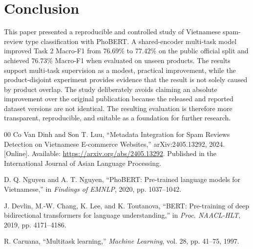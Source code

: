 \documentclass[runningheads]{llncs}
\begin{document}
\section{Conclusion}
This paper presented a reproducible and controlled study of Vietnamese spam-review type classification with PhoBERT. A shared-encoder multi-task model improved Task 2 Macro-F1 from 76.69\% to 77.42\% on the public official split and achieved 76.73\% Macro-F1 when evaluated on unseen products. The results support multi-task supervision as a modest, practical improvement, while the product-disjoint experiment provides evidence that the result is not solely caused by product overlap. The study deliberately avoids claiming an absolute improvement over the original publication because the released and reported dataset versions are not identical. The resulting evaluation is therefore more transparent, reproducible, and suitable as a foundation for further research.

\begin{thebibliography}{00}
Co Van Dinh and Son T. Luu, ``Metadata Integration for Spam Reviews Detection on Vietnamese E-commerce Websites,'' arXiv:2405.13292, 2024. [Online]. Available: \url{https://arxiv.org/abs/2405.13292}. Published in the International Journal of Asian Language Processing.

D. Q. Nguyen and A. T. Nguyen, ``PhoBERT: Pre-trained language models for Vietnamese,'' in \emph{Findings of EMNLP}, 2020, pp. 1037--1042.

J. Devlin, M.-W. Chang, K. Lee, and K. Toutanova, ``BERT: Pre-training of deep bidirectional transformers for language understanding,'' in \emph{Proc. NAACL-HLT}, 2019, pp. 4171--4186.

R. Caruana, ``Multitask learning,'' \emph{Machine Learning}, vol. 28, pp. 41--75, 1997.
\end{thebibliography}
\end{document}
